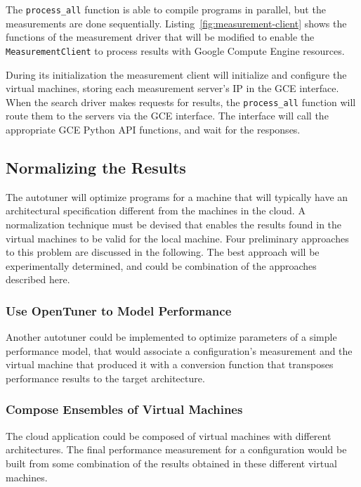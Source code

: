 \documentclass[a4paper, 12pt]{article}
\begin{document}


The \texttt{\footnotesize process\_all} function is able to compile programs in
parallel, but the measurements are done sequentially.
Listing~\ref{fig:measurement-client} shows the functions of the measurement
driver that will be modified to enable the \texttt{\footnotesize
MeasurementClient} to process results with Google Compute Engine resources.

During its initialization the measurement client will initialize and configure
the virtual machines, storing each measurement server's IP in the GCE
interface.  When the search driver makes requests for results, the
\texttt{\footnotesize process\_all} function will route them to the
servers via the GCE interface.  The interface will call the appropriate GCE
Python API functions, and wait for the responses.

\subsection{Normalizing the Results}

The autotuner will optimize programs for a machine that will typically have an
architectural specification different from the machines in the cloud. A
normalization technique must be devised that enables the results found in the
virtual machines to be valid for the local machine.  Four preliminary
approaches to this problem are discussed in the following. The best approach
will be experimentally determined, and could be combination of the approaches
described here.

\subsubsection{Use OpenTuner to Model Performance}

Another autotuner could be implemented to optimize parameters of a simple
performance model, that would associate a configuration's measurement and the
virtual machine that produced it with a conversion function that transposes
performance results to the target architecture.

\subsubsection{Compose Ensembles of Virtual Machines}

The cloud application could be composed of virtual machines with different
architectures. The final performance measurement for a configuration would be
built from some combination of the results obtained in these different virtual
machines.
\end{document}
